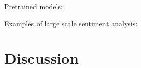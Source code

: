\documentclass[11pt]{article}
\begin{document}


Pretrained models:



Examples of large scale sentiment analysis:





\section{Discussion}
\label{sec:discussion}




\end{document}
